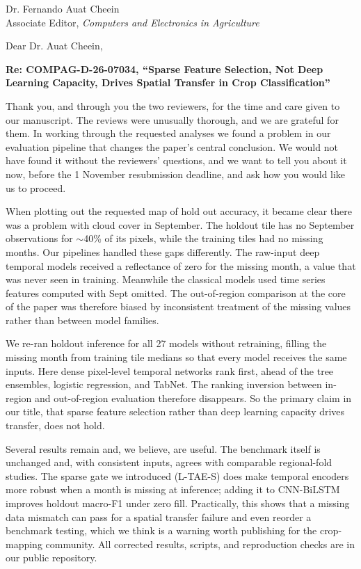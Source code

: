 \documentclass[11pt]{letter}
\begin{document}
\begin{letter}{Dr. Fernando Auat Cheein \\ Associate Editor, \textit{Computers and Electronics in Agriculture}}

\date{October 21, 2026}
\opening{Dear Dr. Auat Cheein,}

\noindent\textbf{Re: COMPAG-D-26-07034, ``Sparse Feature Selection, Not Deep Learning Capacity, Drives Spatial Transfer in Crop Classification''}

Thank you, and through you the two reviewers, for the time and care given to our manuscript. The reviews were unusually thorough, and we are grateful for them. In working through the requested analyses we found a problem in our evaluation pipeline that changes the paper's central conclusion. We would not have found it without the reviewers' questions, and we want to tell you about it now, before the 1 November resubmission deadline, and ask how you would like us to proceed.

When plotting out the requested map of hold out accuracy, it became clear there was a problem with cloud cover in September. The holdout tile has no September observations for $\sim$40\% of its pixels, while the training tiles had no missing months. Our pipelines handled these gaps differently. The raw-input deep temporal models received a reflectance of zero for the missing month, a value that was never seen in training. Meanwhile the classical models used time series features computed with Sept omitted. The out-of-region comparison at the core of the paper was therefore biased by inconsistent treatment of the missing values rather than between model families.

We re-ran holdout inference for all 27 models without retraining, filling the missing month from training tile medians so that every model receives the same inputs. Here dense pixel-level temporal networks rank first, ahead of the tree ensembles, logistic regression, and TabNet. The ranking inversion between in-region and out-of-region evaluation therefore disappears. So the primary claim in our title, that sparse feature selection rather than deep learning capacity drives transfer, does not hold.

Several results remain and, we believe, are useful. The benchmark itself is unchanged and, with consistent inputs, agrees with comparable regional-fold studies. The sparse gate we introduced (L-TAE-S) does make temporal encoders more robust when a month is missing at inference; adding it to CNN-BiLSTM improves holdout macro-F1 under zero fill. Practically, this shows that a missing data mismatch can pass for a spatial transfer failure and even reorder a benchmark testing, which we think is a warning worth publishing for the crop-mapping community. All corrected results, scripts, and reproduction checks are in our public repository.


\end{letter}
\end{document}
